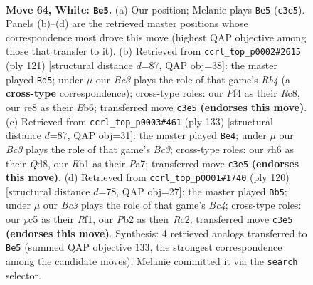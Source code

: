 \documentclass[11pt]{article}
\begin{document}
\clearpage

\begin{figure}[p]\centering
\begin{subfigure}{0.46\textwidth}\centering
\resizebox{\linewidth}{!}{%
\newchessgame
\chessboard[
  setfen={4rb2/5kp1/p6r/Pppb1p1p/2p2P1P/2B1P1P1/1P2K2N/1R4R1 w - - 0 64},
  showmover=false,
  pgfstyle=straightmove, color=movearrow, markmove={c3-e5}
]}
\caption{}
\end{subfigure}\hfill
\begin{subfigure}{0.46\textwidth}\centering
\resizebox{\linewidth}{!}{%
\newchessgame
\chessboard[
  setfen={2r5/3k4/1bp1ppp1/pr5p/2RP3P/1PR1B1P1/P3KP2/8 b - - 49 61},
  showmover=false,
  pgfstyle=straightmove, color=movearrow, markmove={b5-d5}
]}
\caption{}
\end{subfigure}
\\[4pt]
\begin{subfigure}{0.46\textwidth}\centering
\resizebox{\linewidth}{!}{%
\newchessgame
\chessboard[
  setfen={3q4/pr4pk/1pbPp2p/2p1Bp2/2P2P2/P3P2P/1R4PK/3Q4 b - - 16 67},
  showmover=false,
  pgfstyle=straightmove, color=movearrow, markmove={c6-e4}
]}
\caption{}
\end{subfigure}\hfill
\begin{subfigure}{0.46\textwidth}\centering
\resizebox{\linewidth}{!}{%
\newchessgame
\chessboard[
  setfen={r7/4kp2/5r1p/p1p1p1pP/P1BbP1K1/1P3PP1/2R5/5R2 w - - 50 61},
  showmover=false,
  pgfstyle=straightmove, color=movearrow, markmove={c4-b5}
]}
\caption{}
\end{subfigure}
\caption{\textbf{Move 64, White: \texttt{Be5}.} (a) Our position; Melanie plays \texttt{Be5} (\texttt{c3e5}). Panels (b)--(d) are the retrieved master positions whose correspondence most drove this move (highest QAP objective among those that transfer to it). (b) Retrieved from \texttt{ccrl\_top\_p0002\#2615} (ply 121) [structural distance $d$=87, QAP obj=38]: the master played \texttt{Rd5}; under $\mu$ our \emph{Bc3} plays the role of that game's \emph{Rb4} (a \textbf{cross-type} correspondence); cross-type roles: our \emph{P}f4 as their \emph{R}c8, our \emph{r}e8 as their \emph{B}b6; transferred move \texttt{c3e5} \textbf{(endorses this move)}. (c) Retrieved from \texttt{ccrl\_top\_p0003\#461} (ply 133) [structural distance $d$=87, QAP obj=31]: the master played \texttt{Be4}; under $\mu$ our \emph{Bc3} plays the role of that game's \emph{Bc3}; cross-type roles: our \emph{r}h6 as their \emph{Q}d8, our \emph{R}b1 as their \emph{P}a7; transferred move \texttt{c3e5} \textbf{(endorses this move)}. (d) Retrieved from \texttt{ccrl\_top\_p0001\#1740} (ply 120) [structural distance $d$=78, QAP obj=27]: the master played \texttt{Bb5}; under $\mu$ our \emph{Bc3} plays the role of that game's \emph{Bc4}; cross-type roles: our \emph{p}c5 as their \emph{R}f1, our \emph{P}b2 as their \emph{R}c2; transferred move \texttt{c3e5} \textbf{(endorses this move)}. Synthesis: 4 retrieved analogs transferred to \texttt{Be5} (summed QAP objective 133, the strongest correspondence among the candidate moves); Melanie committed it via the \texttt{search} selector.}
\label{fig:thought-m126}
\end{figure}
\end{document}
